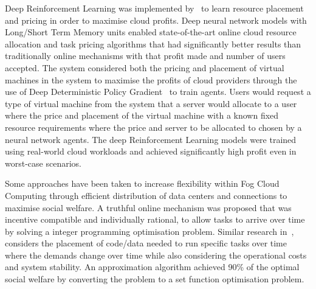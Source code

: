 Deep Reinforcement Learning was implemented by~\cite{Du2019} to learn resource placement and pricing in order to
maximise cloud profits. Deep neural network models with Long/Short Term Memory units enabled state-of-the-art online
cloud resource allocation and task pricing algorithms that had significantly better results than traditionally
online mechanisms with that profit made and number of users accepted. The system considered both the pricing and
placement of virtual machines in the system to maximise the profits of cloud providers through the use of Deep
Deterministic Policy Gradient~\citep{ddpg} to train agents. Users would request a type of virtual machine from the
system that a server would allocate to a user where the price and placement of the virtual machine with a known fixed
resource requirements where the price and server to be allocated to chosen by a neural network agents. The deep
Reinforcement Learning models were trained using real-world cloud workloads and achieved significantly high profit even
in worst-case scenarios.

Some approaches have been taken to increase flexibility within Fog Cloud Computing \citep{Bi2019} through efficient
distribution of data centers and connections to maximise social welfare. A truthful online mechanism was
proposed that was incentive compatible and individually rational, to allow tasks to arrive over time by solving a
integer programming optimisation problem. Similar research in~\cite{vaji_infocom}, considers the placement of code/data
needed to run specific tasks over time where the demands change over time while also considering the operational costs
and system stability. An approximation algorithm achieved 90\% of the optimal social welfare by converting the problem
to a set function optimisation problem.

